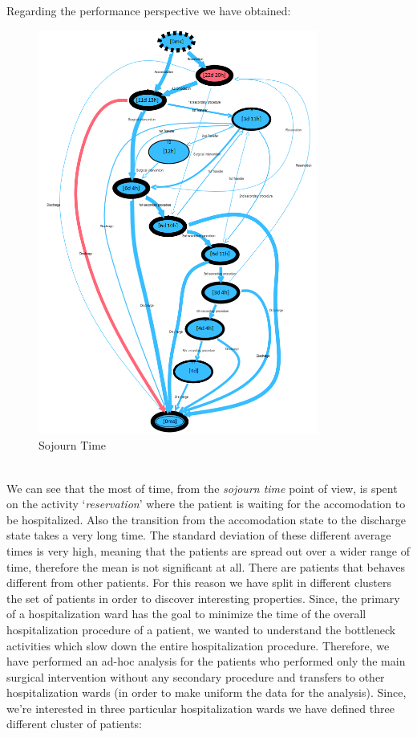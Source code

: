 \clearpage
\noindent
Regarding the performance perspective we have obtained:
\begin{figure} [htbp]
\includegraphics[width=0.82\textwidth]{RicoveriTransitionSystemSojourn}
\caption{Sojourn Time}
\end{figure}\\
We can see that the most of time, from the \textit{sojourn time} point of view, is spent on the activity `\textit{reservation}' where the patient is waiting for the accomodation to be hospitalized. Also the transition from the accomodation state to the discharge state takes a very long time. The standard deviation of these different average times is very high, meaning that the patients are spread out over a wider range of time, therefore the mean is not significant at all. There are patients that behaves different from other patients. For this reason we have split in different clusters the set of patients in order to discover interesting properties. Since, the primary of a hospitalization ward has the goal to minimize the time of the overall hospitalization procedure of a patient, we wanted to understand the bottleneck activities which slow down the entire hospitalization procedure. Therefore, we have performed an ad-hoc analysis for the patients who performed only the main surgical intervention without any secondary procedure and transfers to other hospitalization wards (in order to make uniform the data for the analysis). Since, we're interested in three particular hospitalization wards we have defined three different cluster of patients:
